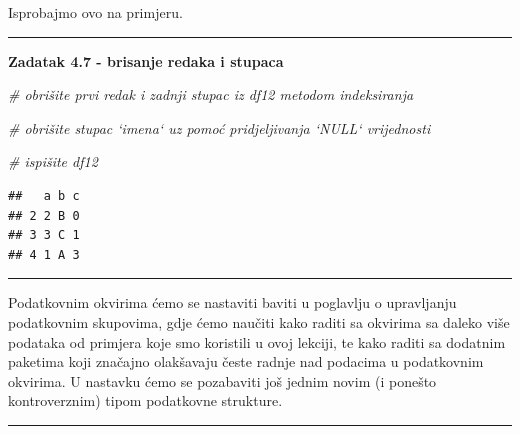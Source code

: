\documentclass[]{book}
\newenvironment{Shaded}{\begin{snugshade}}{\end{snugshade}}
\newcommand{\DecValTok}[1]{\textcolor[rgb]{0.00,0.00,0.81}{#1}}
\newcommand{\StringTok}[1]{\textcolor[rgb]{0.31,0.60,0.02}{#1}}
\newcommand{\CommentTok}[1]{\textcolor[rgb]{0.56,0.35,0.01}{\textit{#1}}}
\newcommand{\OtherTok}[1]{\textcolor[rgb]{0.56,0.35,0.01}{#1}}
\newcommand{\OperatorTok}[1]{\textcolor[rgb]{0.81,0.36,0.00}{\textbf{#1}}}
\newcommand{\NormalTok}[1]{#1}
\theoremstyle{definition}
\theoremstyle{definition}
\theoremstyle{definition}
\theoremstyle{remark}
\begin{document}
Isprobajmo ovo na primjeru.

\begin{center}\rule{0.5\linewidth}{\linethickness}\end{center}

\textbf{Zadatak 4.7 - brisanje redaka i stupaca}

\begin{Shaded}
\begin{Highlighting}[]
\CommentTok{# obrišite prvi redak i zadnji stupac iz df12 metodom indeksiranja}


\CommentTok{# obrišite stupac `imena` uz pomoć pridjeljivanja `NULL` vrijednosti}


\CommentTok{# ispišite df12}
\end{Highlighting}
\end{Shaded}

\begin{Shaded}
\end{Shaded}

\begin{verbatim}
##   a b c
## 2 2 B 0
## 3 3 C 1
## 4 1 A 3
\end{verbatim}

\begin{center}\rule{0.5\linewidth}{\linethickness}\end{center}

Podatkovnim okvirima ćemo se nastaviti baviti u poglavlju o upravljanju
podatkovnim skupovima, gdje ćemo naučiti kako raditi sa okvirima sa
daleko više podataka od primjera koje smo koristili u ovoj lekciji, te
kako raditi sa dodatnim paketima koji značajno olakšavaju česte radnje
nad podacima u podatkovnim okvirima. U nastavku ćemo se pozabaviti još
jednim novim (i ponešto kontroverznim) tipom podatkovne strukture.

\begin{center}\rule{0.5\linewidth}{\linethickness}\end{center}
\end{document}
